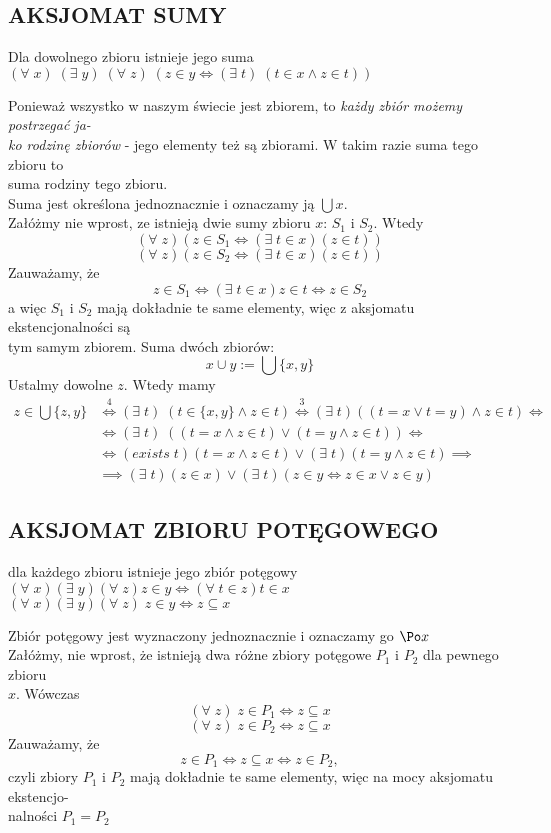 \subsection{AKSJOMAT SUMY}
\begin{center}\large
    Dla dowolnego zbioru istnieje jego suma\smallskip\\
    $(\forall\;x)\;(\exists\;y)\;(\forall\;z)\;(z\in y\iff (\exists\;t)\;(t\in x\land z\in t))$
\end{center}\bigskip
Ponieważ wszystko w naszym świecie jest zbiorem, to \emph{\color{emp}każdy zbiór możemy postrzegać ja-\\ko rodzinę zbiorów} - jego elementy też są zbiorami. W takim razie suma tego zbioru to \\suma rodziny tego zbioru.\medskip\\
{\color{def}Suma jest określona jednoznacznie} i oznaczamy ją $\bigcup x$.\bigskip\\
\dowod
Załóżmy nie wprost, ze istnieją dwie sumy zbioru $x$: $S_1$ i $S_2$. Wtedy
$$(\forall\;z)(z\in S_1\iff (\exists\;t\in x) (z\in t))$$
$$(\forall\;z)(z\in S_2\iff (\exists\;t\in x) (z\in t))$$
Zauważamy, że
$$z\in S_1\iff (\exists\;t\in x)z\in t\iff z\in S_2$$
a więc $S_1$ i $S_2$ mają dokładnie te same elementy, więc z aksjomatu ekstencjonalności są \\tym samym zbiorem.
\kondow
Suma dwóch zbiorów:
$$x\cup y := \bigcup\{x, y\}$$
\dowod
Ustalmy dowolne $z$. Wtedy mamy
\begin{align*}
    z\in \bigcup\{z, y\}&\overset{4}\iff (\exists\;t)\;(t\in \{x, y\}\land z\in t)\overset{3}\iff (\exists\;t)((t=x\lor t=y)\land z\in t)\iff\\
    &\iff (\exists\;t)\;((t=x\land z\in t)\lor (t=y\land z\in t))\iff \\
    &\iff (exists\;t)(t=x\land z\in t)\lor(\exists\;t)(t=y\land z\in t)\implies\\
    &\implies (\exists\;t)(z\in x)\lor (\exists\;t)(z\in y\iff z\in x\lor z\in y)
\end{align*}
\kondow
\subsection{AKSJOMAT ZBIORU POTĘGOWEGO}
\begin{center}\large
    dla każdego zbioru istnieje jego zbiór potęgowy\smallskip\\
    $(\forall\;x)(\exists\;y)(\forall\;z)z\in y\iff (\forall\;t\in z) t\in x$\smallskip\\
    $(\forall\;x)(\exists\;y)(\forall\;z) \;z\in y\iff z\subseteq x$
\end{center}\bigskip
Zbiór potęgowy jest wyznaczony jednoznacznie i oznaczamy go $\Po x$\medskip\\
\dowod
Załóżmy, nie wprost, że istnieją dwa różne zbiory potęgowe $P_1$ i $P_2$ dla pewnego zbioru \\$x$. Wówczas
$$(\forall\;z)\;z\in P_1\iff z\subseteq x$$
$$(\forall\;z)\;z\in P_2\iff z\subseteq x$$
Zauważamy, że
$$z\in P_1\iff z\subseteq x\iff z\in P_2,$$
czyli zbiory $P_1$ i $P_2$ mają dokładnie te same elementy, więc na mocy aksjomatu ekstencjo-\\nalności $P_1=P_2$
\kondow
